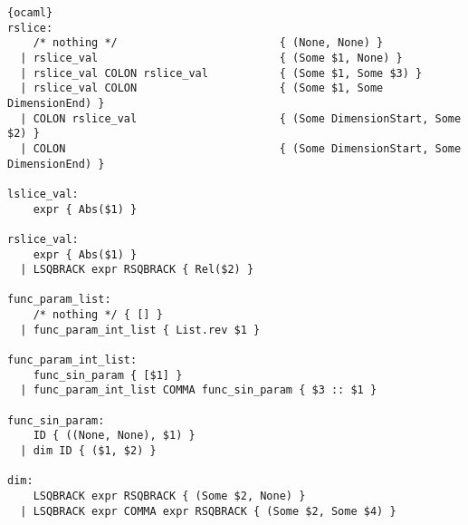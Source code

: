 \begin{lstlisting}{ocaml}
rslice:
    /* nothing */                         { (None, None) }
  | rslice_val                            { (Some $1, None) }
  | rslice_val COLON rslice_val           { (Some $1, Some $3) }
  | rslice_val COLON                      { (Some $1, Some DimensionEnd) }
  | COLON rslice_val                      { (Some DimensionStart, Some $2) }
  | COLON                                 { (Some DimensionStart, Some DimensionEnd) }

lslice_val:
    expr { Abs($1) }

rslice_val:
    expr { Abs($1) }
  | LSQBRACK expr RSQBRACK { Rel($2) }

func_param_list:
    /* nothing */ { [] }
  | func_param_int_list { List.rev $1 }

func_param_int_list:
    func_sin_param { [$1] }
  | func_param_int_list COMMA func_sin_param { $3 :: $1 }

func_sin_param:
    ID { ((None, None), $1) }
  | dim ID { ($1, $2) }

dim:
    LSQBRACK expr RSQBRACK { (Some $2, None) }
  | LSQBRACK expr COMMA expr RSQBRACK { (Some $2, Some $4) }
\end{lstlisting}
